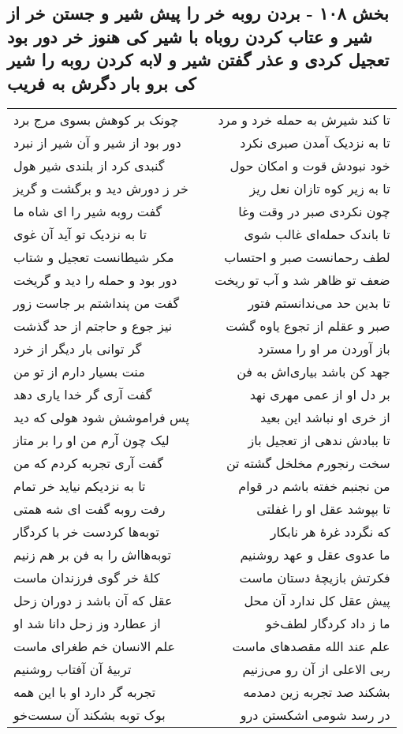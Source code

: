 \begin{center}
\section*{بخش ۱۰۸ - بردن روبه خر را پیش شیر و جستن خر از شیر و عتاب کردن روباه با شیر کی هنوز خر دور بود تعجیل کردی و عذر گفتن  شیر و لابه کردن روبه را شیر کی برو بار دگرش به فریب}
\label{sec:sh108}
\begin{longtable}{l p{0.5cm} r}
چونک بر کوهش بسوی مرج برد
&&
تا کند شیرش به حمله خرد و مرد
\\
دور بود از شیر و آن شیر از نبرد
&&
تا به نزدیک آمدن صبری نکرد
\\
گنبدی کرد از بلندی شیر هول
&&
خود نبودش قوت و امکان حول
\\
خر ز دورش دید و برگشت و گریز
&&
تا به زیر کوه تازان نعل ریز
\\
گفت روبه شیر را ای شاه ما
&&
چون نکردی صبر در وقت وغا
\\
تا به نزدیک تو آید آن غوی
&&
تا باندک حمله‌ای غالب شوی
\\
مکر شیطانست تعجیل و شتاب
&&
لطف رحمانست صبر و احتساب
\\
دور بود و حمله را دید و گریخت
&&
ضعف تو ظاهر شد و آب تو ریخت
\\
گفت من پنداشتم بر جاست زور
&&
تا بدین حد می‌ندانستم فتور
\\
نیز جوع و حاجتم از حد گذشت
&&
صبر و عقلم از تجوع یاوه گشت
\\
گر توانی بار دیگر از خرد
&&
باز آوردن مر او را مسترد
\\
منت بسیار دارم از تو من
&&
جهد کن باشد بیاری‌اش به فن
\\
گفت آری گر خدا یاری دهد
&&
بر دل او از عمی مهری نهد
\\
پس فراموشش شود هولی که دید
&&
از خری او نباشد این بعید
\\
لیک چون آرم من او را بر متاز
&&
تا ببادش ندهی از تعجیل باز
\\
گفت آری تجربه کردم که من
&&
سخت رنجورم مخلخل گشته تن
\\
تا به نزدیکم نیاید خر تمام
&&
من نجنبم خفته باشم در قوام
\\
رفت روبه گفت ای شه همتی
&&
تا بپوشد عقل او را غفلتی
\\
توبه‌ها کردست خر با کردگار
&&
که نگردد غرهٔ هر نابکار
\\
توبه‌هااش را به فن بر هم زنیم
&&
ما عدوی عقل و عهد روشنیم
\\
کلهٔ خر گوی فرزندان ماست
&&
فکرتش بازیچهٔ دستان ماست
\\
عقل که آن باشد ز دوران زحل
&&
پیش عقل کل ندارد آن محل
\\
از عطارد وز زحل دانا شد او
&&
ما ز داد کردگار لطف‌خو
\\
علم الانسان خم طغرای ماست
&&
علم عند الله مقصدهای ماست
\\
تربیهٔ آن آفتاب روشنیم
&&
ربی الاعلی از آن رو می‌زنیم
\\
تجربه گر دارد او با این همه
&&
بشکند صد تجربه زین دمدمه
\\
بوک توبه بشکند آن سست‌خو
&&
در رسد شومی اشکستن درو
\\
\end{longtable}
\end{center}
